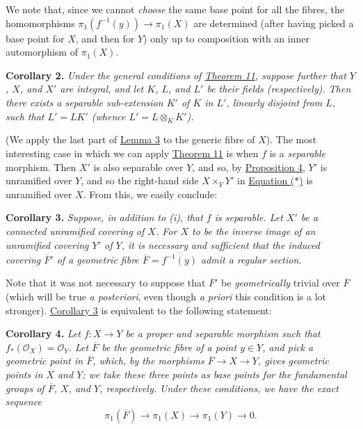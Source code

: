\documentclass{article}
\newenvironment{itenv}[1]
  {\phantomsection\par\smallskip\noindent\textbf{#1.}\itshape}
  {\par\smallskip}
\newcommand{\oldpage}[1]{\marginpar{\footnotesize$\Big\vert$ \textit{p.~#1}}}
\theoremstyle{definition}
\theoremstyle{definition}
\theoremstyle{definition}
\theoremstyle{definition}
\theoremstyle{remark}
\begin{document}
We note that, since we cannot \emph{choose} the same base point for all the fibres, the homomorphisms \(\pi_1(f^{-1}(y))\to\pi_1(X)\) are determined (after having picked a base point for \(X\), and then for \(Y\)) only up to composition with an inner automorphism of \(\pi_1(X)\).

\leavevmode{}%
\begin{itenv}{Corollary 2}
Under the general conditions of \protect\hyperlink{fga-2-theorem-11}{Theorem 11}, suppose further that \(Y\), \(X\), and \(X'\) are integral, and let \(K\), \(L\), and \(L'\) be their fields (respectively).
Then there exists a separable sub-extension \(K'\) of \(K\) in \(L'\), linearly disjoint from \(L\), such that \(L'=LK'\) (whence \(L'=L\otimes_KK'\)).

\end{itenv}

(We apply the last part of \protect\hyperlink{fga-2-lemma-3}{Lemma 3} to the generic fibre of \(X\)).
The most interesting case in which we can apply \protect\hyperlink{fga-2-theorem-11}{Theorem 11} is when \(f\) is a \emph{separable} morphism.
Then \(X'\) is also separable over \(Y\), and so, by \protect\hyperlink{fga-2-proposition-4}{Proposition 4}, \(Y'\) is unramified over \(Y\), and so the right-hand side \(X\times_YY'\) in \protect\hyperlink{fga-2-equation-asterisk}{Equation (\(*\))} is unramified over \(X\).
From this, we easily conclude:

\leavevmode{}%
\begin{itenv}{Corollary 3}
Suppose, in addition to (i), that \(f\) is separable.
Let \(X'\) be a connected unramified covering of \(X\).
For \(X\) to be the inverse image of an unramified covering \(Y'\) of \(Y\), it is necessary and sufficient that the induced covering \(\overline{F}'\) of a geometric fibre \(\overline{F}=\overline{f^{-1}(y)}\) admit a regular section.

\end{itenv}

Note that it was not necessary to suppose that \(\overline{F}'\) be \emph{geometrically} trivial over \(\overline{F}\) (which will be true \emph{a posteriori}, even though \emph{a priori} this condition is a lot stronger).
\oldpage{182-23}\protect\hyperlink{fga-2-theorem-11-corollary-3}{Corollary 3} is equivalent to the following statement:

\leavevmode{}%
\begin{itenv}{Corollary 4}
Let \(f\colon X\to Y\) be a proper and separable morphism such that \(f_*({\mathscr{O}}_X)={\mathscr{O}}_Y\).
Let \(\overline{F}\) be the geometric fibre of a point \(y\in Y\), and pick a geometric point in \(\overline{F}\), which, by the morphisms \(\overline{F}\to X\to Y\), gives geometric points in \(X\) and \(Y\); we take these three points as base points for the fundamental groups of \(\overline{F}\), \(X\), and \(Y\), respectively.
Under these conditions, we have the exact sequence
\[
  \boxed{\pi_1(\overline{F}) \to \pi_1(X) \to \pi_1(Y) \to 0.}
\]

\end{itenv}
\end{document}
